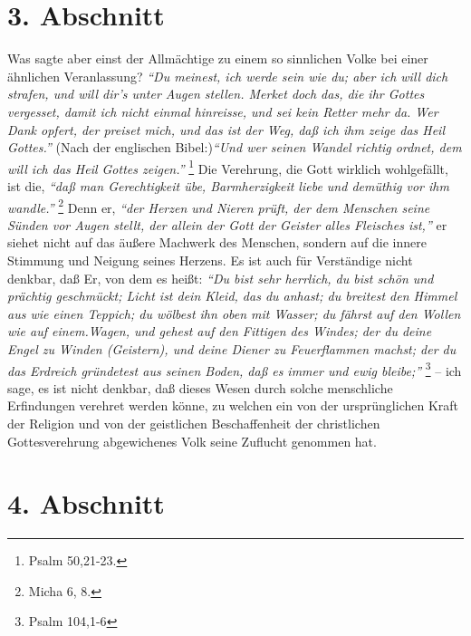 \section{3. Abschnitt} \label{kap5_ab3}


Was sagte aber einst der Allmächtige  zu einem so
sinnlichen Volke bei einer ähnlichen Veranlassung?
\textit{"`Du meinest, ich werde sein wie du; aber ich will dich
strafen, und will dir’s unter Augen stellen. Merket doch das, die ihr Gottes
vergesset, damit ich nicht einmal hinreisse, und sei kein Retter mehr da. Wer
Dank opfert, der preiset mich, und das ist der Weg, daß ich ihm zeige das Heil
Gottes."'} (Nach der englischen Bibel:)\textit{"`Und wer seinen Wandel richtig
ordnet, dem will ich das Heil Gottes zeigen."'}
\footnote{Psalm 50,21-23.}
Die Verehrung, die Gott wirklich wohlgefällt, ist die, \label{Rechtfertigung}  
\textit{"`daß man Gerechtigkeit übe, Barmherzigkeit liebe und demüthig vor ihm
wandle."'}
\footnote{Micha 6, 8.}
Denn er,
\textit{"`der  Herzen und Nieren prüft, der dem Menschen seine Sünden vor Augen
stellt, der allein der Gott der Geister alles Fleisches ist,"'} er siehet nicht
auf das äußere Machwerk des Menschen, sondern auf die innere Stimmung und
Neigung seines Herzens. Es ist auch für Verständige nicht denkbar, daß Er, von
dem es heißt:
\textit{"`Du bist sehr herrlich, du bist schön und prächtig geschmückt;
Licht ist dein Kleid, das du anhast; du breitest den Himmel aus wie einen
Teppich; du wölbest ihn oben mit Wasser; du fährst auf den Wollen wie auf
einem.Wagen, und gehest auf den Fittigen des Windes; der du deine Engel zu
Winden (Geistern), und deine Diener zu Feuerflammen machst; der du das Erdreich
gründetest aus seinen Boden, daß es immer und ewig bleibe;"'}
\footnote{Psalm 104,1-6}
-- ich sage, es ist nicht denkbar, daß dieses Wesen durch solche
menschliche Erfindungen verehret werden könne, zu welchen ein von der
ursprünglichen Kraft der Religion und von der geistlichen Beschaffenheit der
christlichen Gottesverehrung abgewichenes Volk seine Zuflucht genommen hat.

\section{4. Abschnitt} \label{kap5_ab4}

